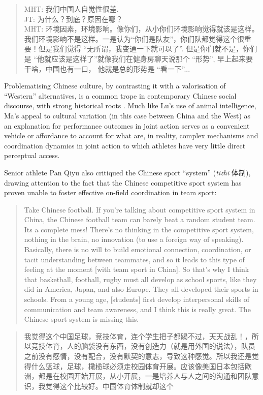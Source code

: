 \begin{CJK}{UTF8}{gbsn}
\begin{quote}
  MHT: 我们中国人自觉性很差. \\
  JT: 为什么？到底？原因在哪？\\
  MHT: 环境因素，环境影响。像你们，从小你们环境影响觉得就该是这样。我们环境影响不是这样。一是认为``你们是队友''，你们队都觉得这个很重要！但是我们觉得 ``无所谓，我变通一下就可以了''. 但是你们就不是，你们是 ``他就应该是这样了''就像我们在健身房聊天说那个 ``形势'', 早上起来要干啥，中国也有一口， 他就是总的形势是  ``看一下''...
\end{quote}

Problematising Chinese culture, by contrasting it with a valorisation of ``Western'' alternatives, is a common trope in contemporary Chinese social discourse, with strong historical roots \citep{Liu1995a}.  Much like Lu's use of animal intelligence, Ma's appeal to cultural variation (in this case between China and the West) as an explanation for performance outcomes in joint action serves as a convenient vehicle or affordance to account for what are, in reality, complex mechanisms and coordination dynamics in joint action to which athletes have very little direct perceptual access.

Senior athlete Pan Qiyu also critiqued the Chinese sport ``system'' (\textit{tizhi} 体制), drawing attention to the fact that the Chinese competitive sport system has proven unable to foster effective on-field coordination in team sport:

\begin{quote}
  Take Chinese football.  If you're talking about competitive sport system in China, the Chinese football team can barely beat a random student team. Its a complete mess! There's no thinking in the competitive sport system, nothing in the brain, no innovation (to use a foreign way of speaking).  Basically, there is no will to build emotional connection, coordination, or tacit understanding between teammates, and so it leads to this type of feeling at the moment [with team sport in China].  So that's why I think that basketball, football, rugby must all develop as school sports, like they did in America, Japan, and also Europe. They all developed their sports in schools. From a young age, [students] first develop interpersonal skills of communication and team awareness, and I think this is really great.  The Chinese sport system is missing this.
\end{quote}

\begin{quote}
  我觉得这个中国足球，竞技体育，连个学生把子都踢不过，天天战乱！，所以竞技体育，人的脑袋没有东西，没有创造力（就是用外国的说法），队员之前没有感情，没有配合，没有默契的意志，导致这种感觉。所以我还是觉得什么篮球，足球，橄榄球必须走校园体育开展。应该像美国日本包括欧洲，都是在校园开始开展，从小开展，一是培养人与人之间的沟通和团队意识，我觉得这个比较好。中国体育体制就却这个
\end{quote}


\end{CJK}
